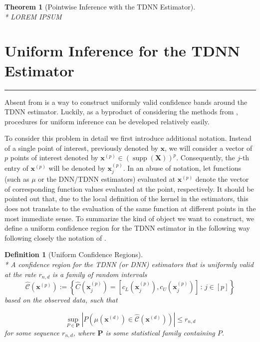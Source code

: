 \documentclass[letterpaper,10pt]{article}
\numberwithin{equation}{section}
\newtheorem{thm}{Theorem}
\numberwithin{thm}{section}
\newtheorem{dfn}{Definition}
\numberwithin{lem}{section}
\numberwithin{cor}{section}
\renewcommand{\hat}{\widehat}
\newcommand{\1}{\mathbbm{1}}
\begin{document}
{\color{red}
	\begin{thm}[Pointwise Inference with the TDNN Estimator]\label{thm:pw_inf_TDNN}\mbox{}\\*
		LOREM IPSUM
	\end{thm}
}

\newpage
\section{Uniform Inference for the TDNN Estimator}\label{unif_inf}
\hrule
Absent from \citet{demirkaya_optimal_2024} is a way to construct uniformly valid confidence bands around the TDNN estimator.
Luckily, as a byproduct of considering the methods from \citet{ritzwoller_uniform_2024}, procedures for uniform inference can be developed relatively easily.

To consider this problem in detail we first introduce additional notation.
Instead of a single point of interest, previously denoted by $\mathbf{x}$, we will consider a vector of $p$ points of interest denoted by $\mathbf{x}^{(p)} \in \left(\operatorname{supp}\left(\mathbf{X}\right)\right)^{p}$.
Consequently, the $j$-th entry of $\mathbf{x}^{(p)}$ will be denoted by $\mathbf{x}^{(p)}_{j}$.
In an abuse of notation, let functions (such as $\mu$ or the DNN/TDNN estimators) evaluated at $\mathbf{x}^{(p)}$ denote the vector of corresponding function values evaluated at the point, respectively.
It should be pointed out that, due to the local definition of the kernel in the estimators, this does not translate to the evaluation of the same function at different points in the most immediate sense.
To summarize the kind of object we want to construct, we define a uniform confidence region for the TDNN estimator in the following way following closely the notation of \citet{ritzwoller_uniform_2024}.


\begin{dfn}[Uniform Confidence Regions]\mbox{}\\*
	A confidence region for the TDNN (or DNN) estimators that is uniformly valid at the rate $r_{n,d}$ is a family of random intervals
	\begin{equation}
		\hat{\mathcal{C}}\left(\mathbf{x}^{(p)}\right)
		:= \left\{\hat{C}(\mathbf{x}^{(p)}_{j})
		= \left[c_{L}(\mathbf{x}^{(p)}_{j}), c_{U}(\mathbf{x}^{(p)}_{j})\right]\, : \, j \in [p]\right\}
	\end{equation}
	based on the observed data, such that

	\begin{equation}
		\sup_{P \in \mathbf{P}} \left| P\left(\mu(\mathbf{x}^{(d)}) \in \hat{\mathcal{C}}\left(\mathbf{x}^{(d)}\right)\right) \right| \leq r_{n,d}
	\end{equation}
	for some sequence $r_{n,d}$, where $\mathbf{P}$ is some statistical family containing $P$.
\end{dfn}
\end{document}
